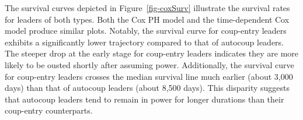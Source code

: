 \documentclass[
  12pt,
]{report}
\begin{document}
The survival curves depicted in Figure~\ref{fig-coxSurv} illustrate the
survival rates for leaders of both types. Both the Cox PH model and the
time-dependent Cox model produce similar plots. Notably, the survival
curve for coup-entry leaders exhibits a significantly lower trajectory
compared to that of autocoup leaders. The steeper drop at the early
stage for coup-entry leaders indicates they are more likely to be ousted
shortly after assuming power. Additionally, the survival curve for
coup-entry leaders crosses the median survival line much earlier (about
3,000 days) than that of autocoup leaders (about 8,500 days). This
disparity suggests that autocoup leaders tend to remain in power for
longer durations than their coup-entry counterparts.

\begin{figure}

\begin{minipage}{0.50\linewidth}



\end{minipage}%
%
\begin{minipage}{0.50\linewidth}

\end{minipage}
\end{figure}
\end{document}
